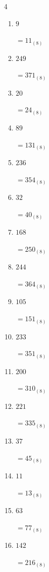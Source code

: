 \begin{multicols}{4}
\begin{enumerate}
        $=232_{(8)}$

  \item $9$

        $=11_{(8)}$

  \item $249$

        $=371_{(8)}$

  \item $20$

        $=24_{(8)}$

  \item $89$

        $=131_{(8)}$

  \item $236$

        $=354_{(8)}$

  \item $32$

        $=40_{(8)}$

  \item $168$

        $=250_{(8)}$

  \item $244$

        $=364_{(8)}$

  \item $105$

        $=151_{(8)}$

  \item $233$

        $=351_{(8)}$

  \item $200$

        $=310_{(8)}$

  \item $221$

        $=335_{(8)}$

\columnbreak %

  \item $37$

        $=45_{(8)}$

  \item $11$

        $=13_{(8)}$

  \item $63$

        $=77_{(8)}$

  \item $142$

        $=216_{(8)}$


\end{enumerate}
\end{multicols}
